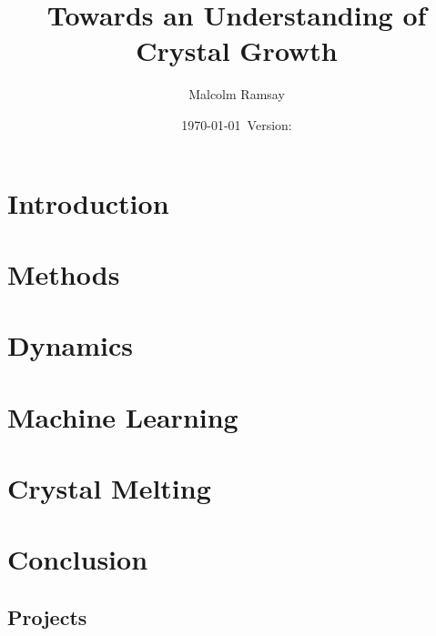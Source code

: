 \documentclass[12pt, a4paper]{report}
\title{Towards an Understanding of Crystal Growth}
\author{Malcolm Ramsay}
\date{\today{}~Version: \version}
\begin{document}
\beforepreface{}
\afterpreface{}

\chapter{Introduction}







\chapter{Methods}






\chapter{Dynamics}




\chapter{Machine Learning}




\chapter{Crystal Melting}




\chapter{Conclusion}

\printbibliography{}

\begin{appendices}
  \chapter{Projects}
  

\end{appendices}
\end{document}

